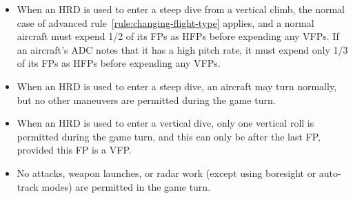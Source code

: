 {\begin{itemize}
    \item When an HRD is used to enter a steep dive from a vertical climb, the normal case of advanced rule~\ref{rule:changing-flight-type} applies, and a normal aircraft must expend 1/2 of its FPs as HFPs before expending any VFPs. If an aircraft's ADC notes that it has a high pitch rate, it must expend only 1/3 of its FPs as HFPs before expending any VFPs.
    
    \item When an HRD is used to enter a steep dive, an aircraft may turn normally, but no other maneuvers are permitted during the game turn.

    \item When an HRD is used to enter a vertical dive, only one vertical roll is permitted during the game turn, and this can only be after the last FP, provided this FP is a VFP.

    \item No attacks, weapon launches, or radar work (except using boresight or auto-track modes) are permitted in the game turn.
    
\end{itemize}

}
\label{rule:sustained-rolling-maneuvers}

